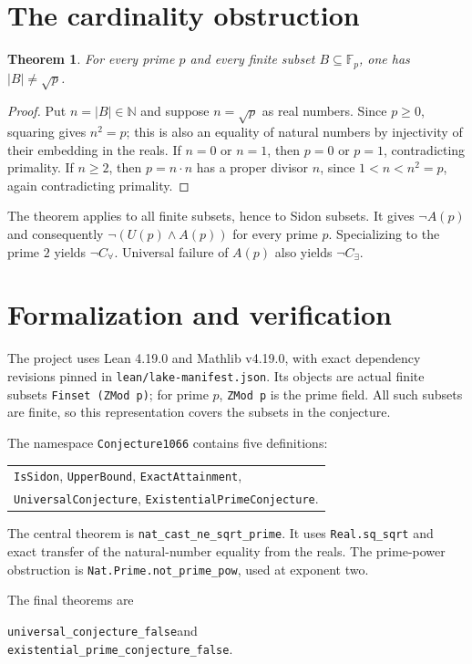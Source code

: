 \documentclass[11pt]{article}
\newtheorem{theorem}{Theorem}
\begin{document}
\section{The cardinality obstruction}
\begin{theorem}
For every prime $p$ and every finite subset $B\subseteq\mathbb F_p$,
one has $|B|\ne\sqrt p$.
\end{theorem}
\begin{proof}
Put $n=|B|\in\mathbb N$ and suppose $n=\sqrt p$ as real numbers.
Since $p\ge0$, squaring gives $n^2=p$; this is also an equality
of natural numbers by injectivity of their embedding in the reals.
If $n=0$ or $n=1$, then $p=0$ or $p=1$, contradicting primality.
If $n\ge2$, then $p=n\cdot n$ has a proper divisor $n$, since
$1<n<n^2=p$, again contradicting primality.
\end{proof}

The theorem applies to all finite subsets, hence to Sidon subsets.
It gives $\neg A(p)$ and consequently $\neg(U(p)\land A(p))$ for
every prime $p$. Specializing to the prime $2$ yields
$\neg C_{\forall}$. Universal failure of $A(p)$ also yields
$\neg C_{\exists}$.

\section{Formalization and verification}
The project uses Lean 4.19.0 and Mathlib v4.19.0, with exact
dependency revisions pinned in \texttt{lean/lake-manifest.json}.
Its objects are actual finite subsets \texttt{Finset (ZMod p)};
for prime $p$, \texttt{ZMod p} is the prime field.
All such subsets are finite, so this representation covers the
subsets in the conjecture.

The namespace \texttt{Conjecture1066} contains five definitions:
\begin{center}
\begin{tabular}{l}
\texttt{IsSidon}, \texttt{UpperBound}, \texttt{ExactAttainment},\\
\texttt{UniversalConjecture}, \texttt{ExistentialPrimeConjecture}.
\end{tabular}
\end{center}
\begin{flushleft}
The central theorem is \texttt{nat\_cast\_ne\_sqrt\_prime}.
It uses \texttt{Real.sq\_sqrt} and exact transfer of the
natural-number equality from the reals. The prime-power obstruction
is \texttt{Nat.Prime.not\_prime\_pow}, used at exponent two.
\end{flushleft}
The final theorems are
\begin{center}
\texttt{universal\_conjecture\_false}\qquad and\\
\texttt{existential\_prime\_conjecture\_false}.
\end{center}
\end{document}
